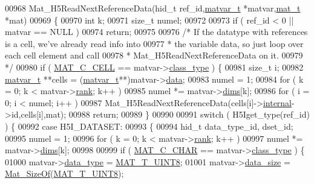 \begin{DoxyCode}
00968 Mat\_H5ReadNextReferenceData(hid\_t ref\_id,\hyperlink{group___m_a_t_structmatvar__t}{matvar\_t} *matvar,\hyperlink{struct__mat__t}{mat\_t} *mat)
00969 \{
00970     \textcolor{keywordtype}{int} k;
00971     \textcolor{keywordtype}{size\_t} numel;
00972 
00973     \textcolor{keywordflow}{if} ( ref\_id < 0 || matvar == NULL )
00974         \textcolor{keywordflow}{return};
00975 
00976     \textcolor{comment}{/* If the datatype with references is a cell, we've already read info into}
00977 \textcolor{comment}{     * the variable data, so just loop over each cell element and call}
00978 \textcolor{comment}{     * Mat\_H5ReadNextReferenceData on it.}
00979 \textcolor{comment}{     */}
00980     \textcolor{keywordflow}{if} ( \hyperlink{group___m_a_t_ggad4d60ae7b709fc81bfd744fb4c857c40a2f7abb47a1c51e248bd4e5e03cc81b08}{MAT\_C\_CELL} == matvar->\hyperlink{group___m_a_t_aff13035bf3265dd7d9425e5d40c839d4}{class\_type} ) \{
00981         \textcolor{keywordtype}{size\_t} i;
00982         \hyperlink{group___m_a_t_structmatvar__t}{matvar\_t} **cells = (\hyperlink{group___m_a_t_structmatvar__t}{matvar\_t}**)matvar->\hyperlink{group___m_a_t_a5672978efa230bbdecdf38ede781f7fa}{data};
00983         numel = 1;
00984         for ( k = 0; k < matvar->\hyperlink{group___m_a_t_a84ba70c96ded13cc555fa75b768d9921}{rank}; k++ )
00985             numel *= matvar->\hyperlink{group___m_a_t_a8e01234e1c862ce3472bb37f5a09b92c}{dims}[k];
00986         for ( i = 0; i < numel; i++ )
00987             Mat\_H5ReadNextReferenceData(cells[i]->\hyperlink{namespaceinternal}{internal}->id,cells[i],mat);
00988         \textcolor{keywordflow}{return};
00989     \}
00990 
00991     \textcolor{keywordflow}{switch} ( H5Iget\_type(ref\_id) ) \{
00992         \textcolor{keywordflow}{case} H5I\_DATASET:
00993         \{
00994             hid\_t data\_type\_id, dset\_id;
00995             numel = 1;
00996             \textcolor{keywordflow}{for} ( k = 0; k < matvar->\hyperlink{group___m_a_t_a84ba70c96ded13cc555fa75b768d9921}{rank}; k++ )
00997                 numel *= matvar->\hyperlink{group___m_a_t_a8e01234e1c862ce3472bb37f5a09b92c}{dims}[k];
00998 
00999             if ( \hyperlink{group___m_a_t_ggad4d60ae7b709fc81bfd744fb4c857c40aacdec5834df0861130b393697646119c}{MAT\_C\_CHAR} == matvar->\hyperlink{group___m_a_t_aff13035bf3265dd7d9425e5d40c839d4}{class\_type} ) \{
01000                 matvar->\hyperlink{group___m_a_t_ab6aafe9bd77f0f077852593dec438144}{data\_type} = \hyperlink{group___m_a_t_ggacf7b3b879282b7ab3a51190e49bf3453a01c1bd7db68f90552862eb5d311be408}{MAT\_T\_UINT8};
01001                 matvar->\hyperlink{group___m_a_t_a9ad1c82e2b568da617e12dc73a26e1f9}{data\_size} = \hyperlink{group__mat__util_gab6774aabdc124c540c1e7686d0804940}{Mat\_SizeOf}(\hyperlink{group___m_a_t_ggacf7b3b879282b7ab3a51190e49bf3453a01c1bd7db68f90552862eb5d311be408}{MAT\_T\_UINT8});

\end{DoxyCode}

